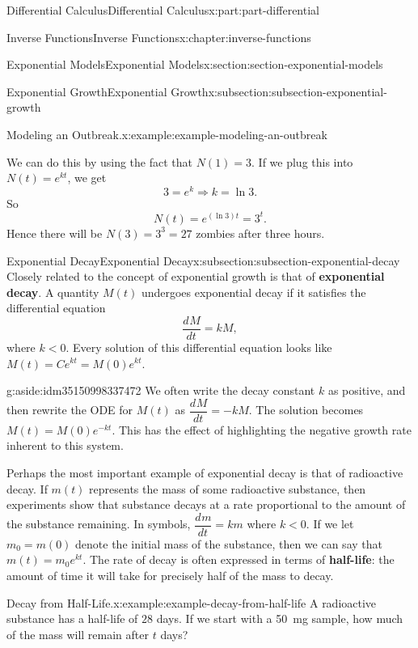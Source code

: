 \documentclass[twoside,10pt,]{book}
\newcommand{\terminology}[1]{\textbf{#1}}
\numberwithin{equation}{part}
\newcommand{\dv}[3][]{\dfrac{d^{#1} #2}{d #3^{#1}}}
\begin{document}
\begin{partptx}{Differential Calculus}{}{Differential Calculus}{}{}{x:part:part-differential}
\begin{chapterptx}{Inverse Functions}{}{Inverse Functions}{}{}{x:chapter:inverse-functions}
\begin{sectionptx}{Exponential Models}{}{Exponential Models}{}{}{x:section:section-exponential-models}
\begin{subsectionptx}{Exponential Growth}{}{Exponential Growth}{}{}{x:subsection:subsection-exponential-growth}
\begin{example}{Modeling an Outbreak.}{x:example:example-modeling-an-outbreak}
\par
We can do this by using the fact that \(N(1) = 3\). If we plug this into \(N(t) = e^{kt}\), we get%
\begin{equation*}
3 = e^{k} \Rightarrow k = \ln3.
\end{equation*}
So%
\begin{equation*}
N(t) = e^{(\ln 3)t} = 3^{t}.
\end{equation*}
Hence there will be \(N(3) = 3^{3} = 27\) zombies after three hours.%
\end{example}
\end{subsectionptx}
%
%
\typeout{************************************************}
\typeout{************************************************}
%
\begin{subsectionptx}{Exponential Decay}{}{Exponential Decay}{}{}{x:subsection:subsection-exponential-decay}
Closely related to the concept of exponential growth is that of \terminology{exponential decay}. A quantity \(M(t)\) undergoes exponential decay if it satisfies the differential equation%
\begin{equation*}
\dv{M}{t} = kM,
\end{equation*}
where \(k < 0\). Every solution of this differential equation looks like \(M(t) = Ce^{kt} = M(0)e^{kt}\).%
\begin{aside}{}{g:aside:idm35150998337472}%
We often write the decay constant \(k\) as positive, and then rewrite the ODE for \(M(t)\) as \(\dv{M}{t} = -kM\). The solution becomes \(M(t) = M(0)e^{-kt}\). This has the effect of highlighting the negative growth rate inherent to this system.%
\end{aside}
Perhaps the most important example of exponential decay is that of radioactive decay. If \(m(t)\) represents the mass of some radioactive substance, then experiments show that substance decays at a rate proportional to the amount of the substance remaining. In symbols, \(\dv{m}{t} = km\) where \(k < 0\). If we let \(m_{0} = m(0)\) denote the initial mass of the substance, then we can say that \(m(t) = m_{0}e^{kt}\). The rate of decay is often expressed in terms of \terminology{half-life}: the amount of time it will take for precisely half of the mass to decay.%
\begin{example}{Decay from Half-Life.}{x:example:example-decay-from-half-life}%
A radioactive substance has a half-life of \(28\) days. If we start with a \SI{50}{\milli\gram} sample, how much of the mass will remain after \(t\) days?%
\par\smallskip%

\end{example}
\end{subsectionptx}
\end{sectionptx}
\end{chapterptx}
\end{partptx}
\end{document}
